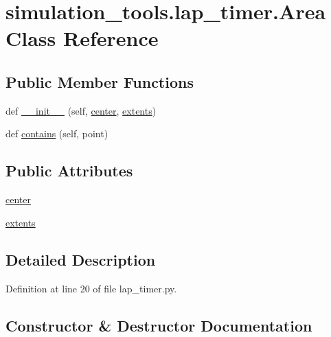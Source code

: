 \hypertarget{classsimulation__tools_1_1lap__timer_1_1_area}{}\section{simulation\+\_\+tools.\+lap\+\_\+timer.\+Area Class Reference}
\label{classsimulation__tools_1_1lap__timer_1_1_area}
\subsection*{Public Member Functions}
\begin{DoxyCompactItemize}
\item 
def \hyperlink{classsimulation__tools_1_1lap__timer_1_1_area_a2e75d876da719cbb38730d143eecd8e3}{\+\_\+\+\_\+init\+\_\+\+\_\+} (self, \hyperlink{classsimulation__tools_1_1lap__timer_1_1_area_ab6d54ce6f15f7931e2c97c418ef275ec}{center}, \hyperlink{classsimulation__tools_1_1lap__timer_1_1_area_a5a876b3d7c79ddb803e0e66d851c8c4d}{extents})
\item 
def \hyperlink{classsimulation__tools_1_1lap__timer_1_1_area_a846e52eda13a26067757cabc759a4f1c}{contains} (self, point)
\end{DoxyCompactItemize}
\subsection*{Public Attributes}
\begin{DoxyCompactItemize}
\item 
\hyperlink{classsimulation__tools_1_1lap__timer_1_1_area_ab6d54ce6f15f7931e2c97c418ef275ec}{center}
\item 
\hyperlink{classsimulation__tools_1_1lap__timer_1_1_area_a5a876b3d7c79ddb803e0e66d851c8c4d}{extents}
\end{DoxyCompactItemize}


\subsection{Detailed Description}


Definition at line 20 of file lap\+\_\+timer.\+py.



\subsection{Constructor \& Destructor Documentation}
